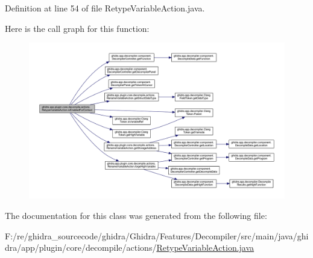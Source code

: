 Definition at line 54 of file Retype\+Variable\+Action.\+java.

Here is the call graph for this function\+:
\nopagebreak
\begin{figure}[H]
\begin{center}
\leavevmode
\includegraphics[width=350pt]{classghidra_1_1app_1_1plugin_1_1core_1_1decompile_1_1actions_1_1_retype_variable_action_a8146e16bb37975dc024530409532dba1_cgraph}
\end{center}
\end{figure}


The documentation for this class was generated from the following file\+:\begin{DoxyCompactItemize}
\item 
F\+:/re/ghidra\+\_\+sourcecode/ghidra/\+Ghidra/\+Features/\+Decompiler/src/main/java/ghidra/app/plugin/core/decompile/actions/\mbox{\hyperlink{_retype_variable_action_8java}{Retype\+Variable\+Action.\+java}}\end{DoxyCompactItemize}
